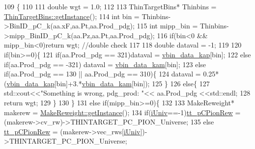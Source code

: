 \begin{DoxyCode}
109                                                                              \{
110     
111     \textcolor{keywordtype}{double} wgt = 1.0;
112 
113     ThinTargetBins*  Thinbins =  \hyperlink{class_neutrino_flux_reweight_1_1_thin_target_bins_aeff5cf7220dd08322f5abac2cbc7ff33}{ThinTargetBins::getInstance}();
114     \textcolor{keywordtype}{int} bin      = Thinbins->BinID\_pC\_k(aa.xF,aa.Pt,aa.Prod\_pdg);
115     \textcolor{keywordtype}{int} mipp\_bin = Thinbins->mipp\_BinID\_pC\_k(aa.Pz,aa.Pt,aa.Prod\_pdg);
116     \textcolor{keywordflow}{if}(bin<0 && mipp\_bin<0)\textcolor{keywordflow}{return} wgt;  \textcolor{comment}{//double check}
117     
118     \textcolor{keywordtype}{double} dataval = -1;
119     
120     \textcolor{keywordflow}{if}(bin>=0)\{
121       \textcolor{keywordflow}{if}(aa.Prod\_pdg == 321)dataval = \hyperlink{class_neutrino_flux_reweight_1_1_thin_targetp_c_kaon_reweighter_a7e9b49e61de648fbe1198c3ae68ce15f}{vbin\_data\_kap}[bin];
122       \textcolor{keywordflow}{else} \textcolor{keywordflow}{if}(aa.Prod\_pdg == -321) dataval = \hyperlink{class_neutrino_flux_reweight_1_1_thin_targetp_c_kaon_reweighter_afdc746047f72743b45affc7f51f8ba3f}{vbin\_data\_kam}[bin];
123       \textcolor{keywordflow}{else} \textcolor{keywordflow}{if}(aa.Prod\_pdg == 130 || aa.Prod\_pdg == 310)\{
124         dataval = 0.25*(\hyperlink{class_neutrino_flux_reweight_1_1_thin_targetp_c_kaon_reweighter_a7e9b49e61de648fbe1198c3ae68ce15f}{vbin\_data\_kap}[bin]+3.*\hyperlink{class_neutrino_flux_reweight_1_1_thin_targetp_c_kaon_reweighter_afdc746047f72743b45affc7f51f8ba3f}{vbin\_data\_kam}[bin]);
125       \}
126       \textcolor{keywordflow}{else}\{
127         std::cout<<\textcolor{stringliteral}{"Something is wrong, pdg\_prod: "}<< aa.Prod\_pdg  <<std::endl;
128         \textcolor{keywordflow}{return} wgt;
129       \}
130     \}
131     \textcolor{keywordflow}{else} \textcolor{keywordflow}{if}(mipp\_bin>=0)\{
132    
133       MakeReweight*  makerew =  \hyperlink{class_neutrino_flux_reweight_1_1_make_reweight_a42d1fa92a1e30bd80538188e0c9d8b4a}{MakeReweight::getInstance}();
134       \textcolor{keywordflow}{if}(\hyperlink{class_neutrino_flux_reweight_1_1_thin_targetp_c_kaon_reweighter_a3ff9d5c19007a8272c69e15cc3c7742b}{iUniv}==-1)\hyperlink{class_neutrino_flux_reweight_1_1_thin_targetp_c_kaon_reweighter_ab6dbf86a7f242f29d1f4e67bf1dc7e2f}{tt\_pCPionRew} = (makerew->cv\_rw)->THINTARGET\_PC\_PION\_Universe;
135       \textcolor{keywordflow}{else} \hyperlink{class_neutrino_flux_reweight_1_1_thin_targetp_c_kaon_reweighter_ab6dbf86a7f242f29d1f4e67bf1dc7e2f}{tt\_pCPionRew} = (makerew->vec\_rws[\hyperlink{class_neutrino_flux_reweight_1_1_thin_targetp_c_kaon_reweighter_a3ff9d5c19007a8272c69e15cc3c7742b}{iUniv}])->THINTARGET\_PC\_PION\_Universe; 

\end{DoxyCode}
